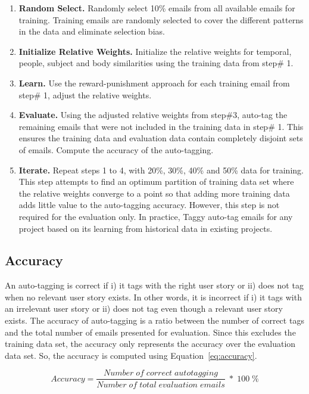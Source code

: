 \begin{enumerate}
	\item \textbf{Random Select.} Randomly select 10\% emails from all available emails for training. Training emails are randomly selected to cover the different patterns in the data and eliminate selection bias.
	\item \textbf{Initialize Relative Weights.} Initialize the relative weights for temporal, people, subject and body similarities using the training data from step\# 1.
	\item \textbf{Learn.} Use the reward-punishment approach for each training email from step\# 1, adjust the relative weights.
	\item \textbf{Evaluate.} Using the adjusted relative weights from step\#3, auto-tag the remaining emails that were not included in the training data in step\# 1. This ensures the training data and evaluation data contain completely disjoint sets of emails. Compute the accuracy of the auto-tagging.
	\item \textbf{Iterate.} Repeat steps 1 to 4, with 20\%, 30\%, 40\% and 50\% data for training. This step attempts to find an optimum partition of  training data set where the relative weights converge to a point so that adding more training data adds little value to the auto-tagging accuracy. However, this step is not required for the evaluation only. In practice, Taggy auto-tag emails for any project based on its learning from historical data in existing projects.
	
\end{enumerate}

\subsection{Accuracy}
An auto-tagging is correct if i) it tags with the right user story or ii) does not tag when no relevant user story exists. In other words, it is incorrect if i) it tags with an irrelevant user story or ii) does not tag even though a relevant user story exists. The accuracy of auto-tagging is a ratio between the number of correct tags and the total number of emails presented for evaluation. Since this excludes the training data set, the accuracy only represents the accuracy over the evaluation data set. So, the accuracy is computed using Equation~\ref{eq:accuracy}.
	
\begin{equation}
\label{eq:accuracy}
Accuracy = \frac{Number \;  of  \; correct  \; auto tagging} {Number \;  of \;  total \;  evaluation \;  emails }  \; *  \; 100  \; \%
\end{equation}
	
